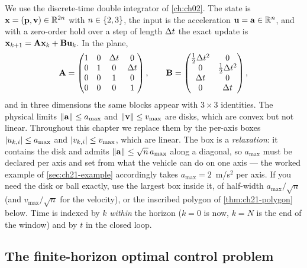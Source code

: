 We use the discrete-time double integrator of \cref{ch:ch02}. The state is
$\mathbf{x}=(\mathbf{p},\mathbf{v})\in\mathbb{R}^{2n}$ with $n\in\left\{ 2,3 \right\}$, the input is the
acceleration $\mathbf{u}=\mathbf{a}\in\mathbb{R}^n$, and with a zero-order hold over a step of
length $\Delta t$ the exact update is $\mathbf{x}_{k+1}=\mathbf{A}\mathbf{x}_k+\mathbf{B}\mathbf{u}_k$.
In the plane,
\begin{equation}
\mathbf{A}=\begin{pmatrix}1&0&\Delta t&0\\0&1&0&\Delta t\\0&0&1&0\\0&0&0&1\end{pmatrix},\qquad
\mathbf{B}=\begin{pmatrix}\tfrac12\Delta t^2&0\\0&\tfrac12\Delta t^2\\\Delta t&0\\0&\Delta t\end{pmatrix},
\label{eq:ch21-model}
\end{equation}
and in three dimensions the same blocks appear with $3\times3$ identities. The
physical limits $\left\lVert \mathbf{a} \right\rVert\le a_{\max}$ and $\left\lVert \mathbf{v} \right\rVert\le v_{\max}$ are
disks, which are convex but not linear. Throughout this chapter we replace
them by the per-axis boxes $\left\lvert u_{k,i} \right\rvert\le a_{\max}$ and $\left\lvert v_{k,i} \right\rvert\le
v_{\max}$, which are linear. The box is a \emph{relaxation}: it contains the
disk and admits $\left\lVert \mathbf{a} \right\rVert\le\sqrt{n}\,a_{\max}$ along a diagonal, so
$a_{\max}$ must be declared per axis and set from what the vehicle can do on
one axis --- the worked example of \cref{sec:ch21-example} accordingly takes
$a_{\max}=2$~m/s$^2$ per axis. If you need the disk or ball exactly, use the
largest box inside it, of half-width $a_{\max}/\sqrt{n}$ (and
$v_{\max}/\sqrt{n}$ for the velocity), or the inscribed polygon of
\cref{thm:ch21-polygon} below. Time is indexed by $k$
\emph{within} the horizon ($k=0$ is now, $k=N$ is the end of the window) and
by $t$ in the closed loop.

\subsection{The finite-horizon optimal control problem}

